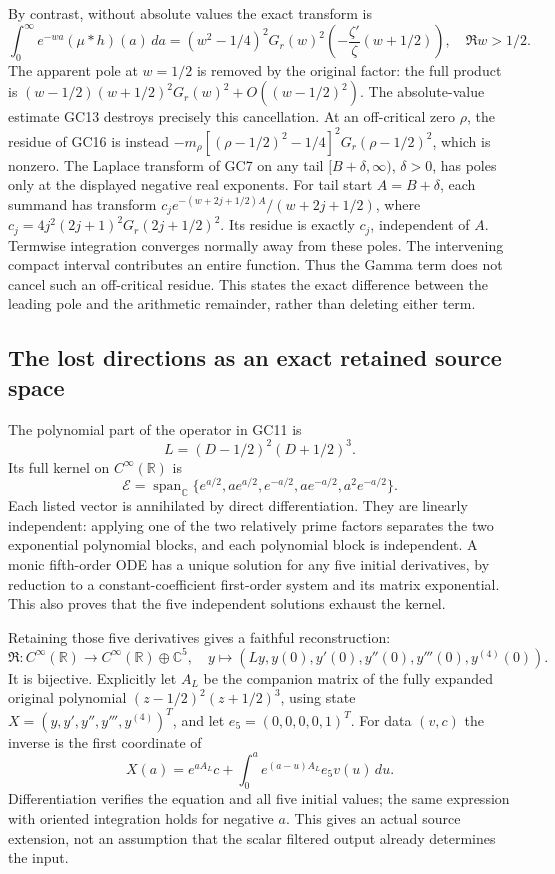 By contrast, without absolute values the exact transform is
\[
 \int_0^\infty e^{-wa}(\mu*h)(a)\,da
  =(w^2-1/4)^2G_r(w)^2
                  \left(-\frac{\zeta'}{\zeta}(w+1/2)\right),
 \quad\Re w>1/2.\tag{GC16}
\]
The apparent pole at \(w=1/2\) is removed by the original factor:
the full product is
\((w-1/2)(w+1/2)^2G_r(w)^2+O((w-1/2)^2)\).
The absolute-value estimate GC13 destroys precisely this cancellation.
At an off-critical zero \(\rho\), the residue of GC16 is instead
\(-m_\rho[(\rho-1/2)^2-1/4]^2G_r(\rho-1/2)^2\), which is nonzero.
The Laplace transform of GC7 on any tail \([B+\delta,\infty)\),
\(\delta>0\), has poles only at the displayed negative real
exponents. For tail start \(A=B+\delta\), each summand has transform
\(c_j e^{-(w+2j+1/2)A}/(w+2j+1/2)\), where
\(c_j=4j^2(2j+1)^2G_r(2j+1/2)^2\). Its residue is exactly
\(c_j\), independent of \(A\). Termwise integration converges normally
away from these poles. The intervening compact interval contributes an
entire function. Thus the Gamma term does not cancel such an
off-critical residue.
This states the exact difference between the leading pole and the
arithmetic remainder, rather than deleting either term.

\subsection{The lost directions as an exact retained source space}

The polynomial part of the operator in GC11 is
\[
 L=(D-1/2)^2(D+1/2)^3.
\]
Its full kernel on \(C^\infty(\mathbb R)\) is
\[
 \mathcal E=\operatorname{span}_{\mathbb C}
 \{e^{a/2},ae^{a/2},e^{-a/2},ae^{-a/2},a^2e^{-a/2}\}.
 \tag{GC17}
\]
Each listed vector is annihilated by direct differentiation. They
are linearly independent: applying one of the two relatively prime
factors separates the two exponential polynomial blocks, and each
polynomial block is independent. A monic fifth-order ODE has a
unique solution for any five initial derivatives, by reduction to
a constant-coefficient first-order system and its matrix exponential.
This also proves that the five independent solutions exhaust the
kernel.

Retaining those five derivatives gives a faithful reconstruction:
\[
 \mathfrak R:C^\infty(\mathbb R)\longrightarrow
 C^\infty(\mathbb R)\oplus\mathbb C^5,\quad
 y\longmapsto(Ly,y(0),y'(0),y''(0),y'''(0),y^{(4)}(0)).
 \tag{GC18}
\]
It is bijective. Explicitly let \(A_L\) be the companion matrix
of the fully expanded original polynomial
\((z-1/2)^2(z+1/2)^3\), using state
\(X=(y,y',y'',y''',y^{(4)})^T\), and let \(e_5=(0,0,0,0,1)^T\).
For data \((v,c)\) the inverse is the first coordinate of
\[
 X(a)=e^{aA_L}c+\int_0^a e^{(a-u)A_L}e_5v(u)\,du.\tag{GC19}
\]
Differentiation verifies the equation and all five initial values;
the same expression with oriented integration holds for negative
\(a\). This gives an actual source extension, not an assumption
that the scalar filtered output already determines the input.

